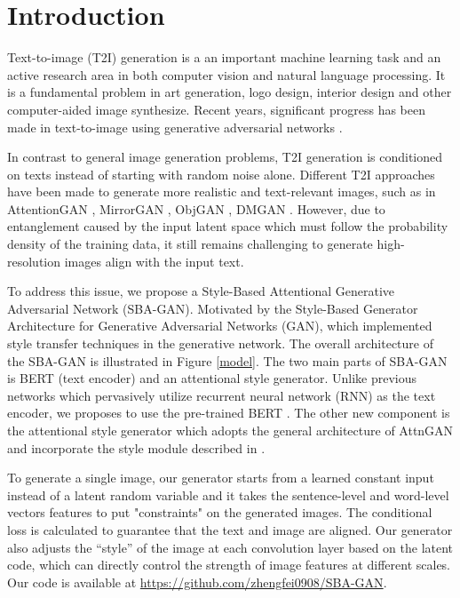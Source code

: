 \documentclass{article}
\begin{document}
\section{Introduction}

Text-to-image (T2I) generation is a an important machine learning task and an active research area in both computer vision and natural language processing. It is a fundamental problem in art generation, logo design, interior design and other computer-aided image synthesize. Recent years, significant progress has been made in text-to-image using generative adversarial networks \cite{gan}. 

In contrast to general image generation problems,
T2I generation is conditioned on texts instead of starting with random noise alone. Different T2I approaches have been made to generate more realistic and text-relevant images, such as in AttentionGAN \cite{attngan}, MirrorGAN \cite{mirrorgan}, ObjGAN \cite{objgan}, DMGAN \cite{dmgan}. However, due to entanglement caused by the input latent space which must follow the probability density of the
training data, it still remains challenging to generate high-resolution images align with the input text.

To address this issue, we propose a Style-Based Attentional Generative Adversarial Network (SBA-GAN). Motivated by the Style-Based Generator Architecture for Generative Adversarial Networks (GAN)\cite{stylegan}, which implemented style transfer techniques\cite{styletransferog} in the generative network. The overall architecture of the SBA-GAN
is illustrated in Figure \ref{model}. The two main parts of SBA-GAN is BERT (text encoder) and an attentional style generator. Unlike previous networks which pervasively utilize recurrent neural network (RNN)\cite{lstm} as the text encoder, we proposes to use the pre-trained BERT \cite{bert}. The other new component is the attentional style generator which adopts the general architecture of AttnGAN\cite{attngan} and incorporate the style module described in \cite{stylegan}.

To generate a single image, our generator starts from a learned constant input instead of a latent random variable and it takes the sentence-level and word-level vectors features to put "constraints" on the generated images. The conditional loss is calculated to guarantee that the text and image are aligned. Our generator also adjusts the “style” of the image at each convolution layer based on the latent
code, which can directly control the strength of image features at different scales. Our code is available at \href{https://github.com/zhengfei0908/SBA-GAN}{https://github.com/zhengfei0908/SBA-GAN}.
\end{document}
